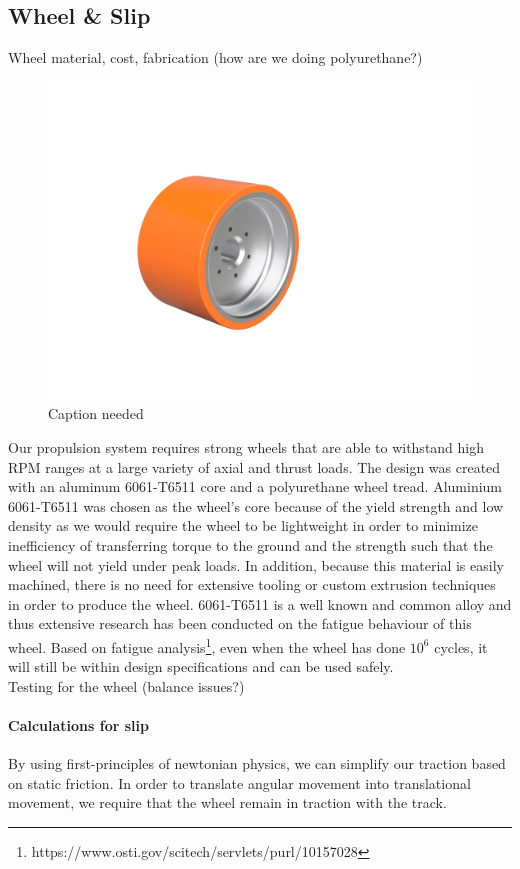 \documentclass[main.tex]{subfiles}
\begin{document}
    \subsection{Wheel \& Slip}
    Wheel material, cost, fabrication (how are we doing polyurethane?)
    \begin{figure}[H]
        \centering
        \includegraphics[width=\linewidth]{images/fig19}
        \caption{Caption needed}
    \end{figure}
    Our propulsion system requires strong wheels that are able to withstand high RPM ranges at a large variety of axial and thrust loads. The design was created with an aluminum 6061-T6511 core and a polyurethane wheel tread. Aluminium 6061-T6511 was chosen as the wheel’s core because of the yield strength and low density as we would require the wheel to be lightweight in order to minimize inefficiency of transferring torque to the ground and the strength such that the wheel will not yield under peak loads. In addition, because this material is easily machined, there is no need for extensive tooling or custom extrusion techniques in order to produce the wheel. 6061-T6511 is a well known and common alloy and thus extensive research has been conducted on the fatigue behaviour of this wheel. Based on fatigue analysis\footnote{ https://www.osti.gov/scitech/servlets/purl/10157028}, even when the wheel has done $10^6$ cycles, it will still be within design specifications and can be used safely.\\

    Testing for the wheel (balance issues?)

    \paragraph{Calculations for slip}
    By using first-principles of newtonian physics, we can simplify our traction based on static friction. In order to translate angular movement into translational movement, we require that the wheel remain in traction with the track.\\
\end{document}
